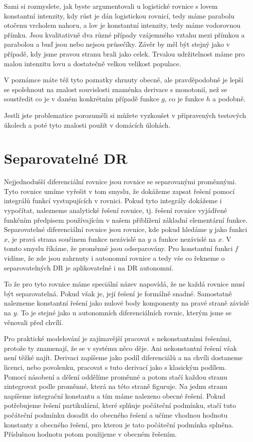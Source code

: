 \documentclass[12pt]{article}
\begin{document}
Sami si rozmyslete, jak byste argumentovali u logistické rovnice s lovem konstantní intenzity, kdy růst je dán logistickou rovnicí, tedy máme parabolu otočenu vrcholem nahoru, a lov je konstantní intenzity, tedy máme vodorovnou přímku. Jsou kvalitativně dva různé případy vzájemného vztahu mezi přímkou a parabolou a buď jsou nebo nejsou průsečíky. Závěr by měl být stejný jako v případě, kdy jsme pravou stranu brali jako celek. Trvalou udržitelnost máme pro malou intenzitu lovu a dostatečně velkou velikost populace.

V poznámce máte též tyto poznatky shrnuty obecně, ale pravděpodobně je lepší se spolehnout na znalost souvislosti znaménka derivace s monotonií, než se soustředit co je v daném konkrétním případě funkce $g$, co je funkce $h$ a podobně.

Jestli jste problematice porozuměli si můžete vyzkoušet v připravených testových úkolech a poté tyto znalosti použít v domácích úlohách. 


\section*{Separovatelné DR}

Nejjednodušší diferenciální rovnice jsou rovnice se separovanými proměnnými. Tyto rovnice umíme vyřešit v tom smyslu, že dokážeme zapsat řešení pomocí integrálů funkcí vystupujících v rovnici. Pokud tyto integrály dokážeme i vypočítat, nalezneme analytické řešení rovnice, tj. řešení rovnice vyjádřené funkčním předpisem používajícím v našem přiblížení základní elementární funkce. Separovatelné diferenciální rovnice jsou rovnice, kde pokud hledáme $y$ jako funkci $x$, je pravá strana součinem funkce nezávislé na $y$ a funkce nezávislé na $x$. V tomto smyslu říkáme, že proměnné jsou odseparovány. Pro konstantní funkci $f$ vidíme, že zde jsou zahrnuty i autonomní rovnice a tedy vše co řekneme o separovatelných DR je aplikovatelné i na DR autonomní.

To že pro tyto rovnice máme speciální název napovídá, že ne každá rovnice musí být separovatelná. Pokud však je, její řešení je formálně snadné. Samostatně nalezneme konstantní řešení jako nulové body komponenty na pravé straně závislé na $y$. To je stejné jako u autonomních diferenciálních rovnic, kterým jsme se věnovali před chvílí.

Pro praktické modelování je zajímavější pracovat s nekonstantními řešeními, protože ty znamenají, že se v systému něco děje. Ani nekonstantní řešení však není těžké najít. Derivaci zapíšeme jako podíl diferenciálů a na chvíli dostaneme licenci, nebo povolenku, pracovat s tuto derivací jako s klasickým podílem. Pomocí násobení a dělení oddělíme proměnné a potom stačí každou stranu zintegrovat podle proměnné, která na této straně figuruje. Na jednu stranu napíšeme integrační konstantu a tím máme nalezeno obecné řešení. Pokud potřebujeme řešení partikulární, které splňuje počáteční podmínku, stačí tuto počáteční podmínku dosadit do obecného řešení a učíme vhodnou hodnotu konstanty z obecného řešení, pro kterou je tato počáteční podmínka splněna. Příslušnou hodnotu potom použijeme v obecném řešením.
\end{document}
